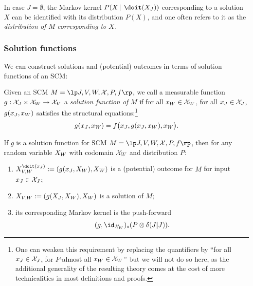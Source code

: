\begin{Rem}
In case $J = \emptyset$, the Markov kernel $P(X \mid \doit(X_J))$ corresponding to a solution $X$ can be identified with its distribution $P(X)$, and one often refers to it as the \emph{distribution of $M$ corresponding to $X$}.
\end{Rem}

\subsubsection{Solution functions}
We can construct solutions and (potential) outcomes in terms of solution functions of an SCM:
\begin{Def}\label{def:scm_solution_functions}\label{def:solution-function}
  Given an SCM $M = \lt \Sin, \Send, \Srnd, \CX, P, f \rt$, we call a measurable function
  $g : \mathcal{X}_{J} \times \mathcal{X}_{W} \to \mathcal{X}_{V}$ a \emph{solution function of $M$} if 
  for all $x_{W}\in\mathcal{X}_{W}$, for all $x_{J}\in\mathcal{X}_{J}$, $g(x_{J},x_{W})$ satisfies the structural equations:\footnote{One can weaken this requirement by replacing the quantifiers by ``for all $x_{J}\in\mathcal{X}_{J}$, for $P$-almost all $x_{W}\in\mathcal{X}_{W}$'' but we will not do so here, as the additional generality of the resulting theory comes at the cost of more technicalities in most definitions and proofs.}
  $$g(x_{J},x_{W}) = f\big(x_{J}, g(x_{J},x_{W}), x_{W}\big).$$
\end{Def}
\begin{Rem}\label{rem:using_solution_functions}
  If $g$ is a solution function for SCM $M = \lt \Sin, \Send, \Srnd, \CX, P, f \rt$,
  then for any random variable $X_{W}$ with codomain $\mathcal{X}_{W}$ and distribution $P$:
  \begin{enumerate}
    \item
      $X_{V,W}^{\doit(\xJ)} := (g(\xJ, \XW),\XW)$ is a (potential) outcome for $M$ for input $x_{J}\in\mathcal{X}_{J}$;
    \item
      $X_{V,W} := (g(X_{J}, X_{W}),X_{W})$ is a solution of $M$;
    \item its corresponding Markov kernel is the push-forward
      $$(g,\id_{\CXW})_* (P \otimes \delta(J|J)).$$
  \end{enumerate}
\end{Rem}
